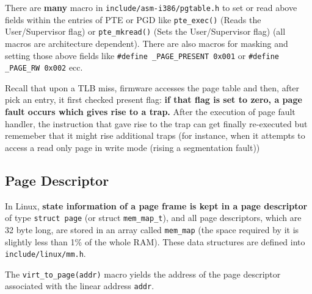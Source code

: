 \documentclass[10pt,a4paper]{article}
\begin{document}
There are \textbf{many} macro in \texttt{include/asm-i386/pgtable.h} to set or read above fields within the entries of PTE or PGD like \texttt{pte\_exec()} (Reads the User/Supervisor flag) or \texttt{pte\_mkread()} (Sets the User/Supervisor flag) (all macros are architecture dependent). There are also macros for masking and setting those above fields like \texttt{\#define \_PAGE\_PRESENT 0x001} or \texttt{\#define \_PAGE\_RW 0x002} ecc.

Recall that upon a TLB miss, firmware accesses the page table and then, after pick an entry, it first checked present flag: \textbf{if that flag is set to zero, a page fault occurs which gives rise to a trap.} After the execution of page fault handler, the instruction that gave rise to the trap can get finally re-executed but rememeber that it might rise additional traps (for instance, when it attempts to access a read only page in write mode (rising a segmentation fault))






\subsection{Page Descriptor}

In Linux, \textbf{state information of a page frame is kept in a page descriptor} of type \texttt{struct page} (or struct \texttt{mem\_map\_t}), and all page descriptors, which are 32 byte long, are stored in an array called \texttt{mem\_map} (the space required by it is slightly less than 1\% of the whole RAM). These data structures are defined into \texttt{include/linux/mm.h}. 

The \texttt{virt\_to\_page(addr)} macro yields the address of the page descriptor associated with the linear address \texttt{addr}. 
\end{document}
